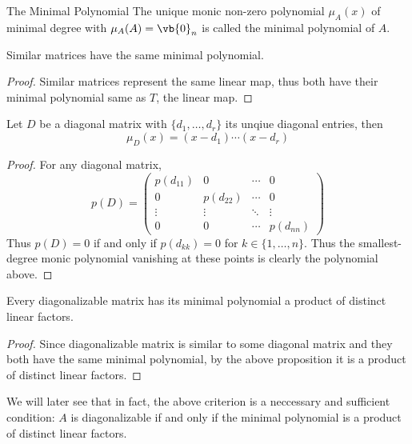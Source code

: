 \begin{defn}{The Minimal Polynomial}{} The unique monic non-zero polynomial $\mu_A(x)$ of minimal degree with $\mu_A(A)=\vb{0}_n$ is called the minimal polynomial of $A$. 
\end{defn}

\begin{prp}{}{} Similar matrices have the same minimal polynomial. \tcbline\begin{proof} Similar matrices represent the same linear map, thus both have their minimal polynomial same as $T$, the linear map. 
\end{proof}
\end{prp}

\begin{prp}{}{} Let $D$ be a diagonal matrix with $\{d_1,\dots,d_r\}$ its unqiue diagonal entries, then $$\mu_D(x)=(x-d_1)\cdots(x-d_r)$$\tcbline
\begin{proof} For any diagonal matrix, $$p(D)=\begin{pmatrix}p(d_{11}) & 0 & \cdots & 0\\ 0 & p(d_{22}) & \cdots & 0 \\ \vdots & \vdots & \ddots & \vdots\\ 0 & 0 & \cdots & p(d_{nn})\end{pmatrix}$$ Thus $p(D)=0$ if and only if $p(d_{kk})=0$ for $k\in\{1,\dots,n\}$. Thus the smallest-degree monic polynomial vanishing at these points is clearly the polynomial above. 
\end{proof}
\end{prp}

\begin{crl}{}{} Every diagonalizable matrix has its minimal polynomial a product of distinct linear factors. \tcbline
\begin{proof} Since diagonalizable matrix is similar to some diagonal matrix and they both have the same minimal polynomial, by the above proposition it is a product of distinct linear factors. 
\end{proof}
\end{crl}

We will later see that in fact, the above criterion is a neccessary and sufficient condition: $A$ is diagonalizable if and only if the minimal polynomial is a product of distinct linear factors. 

